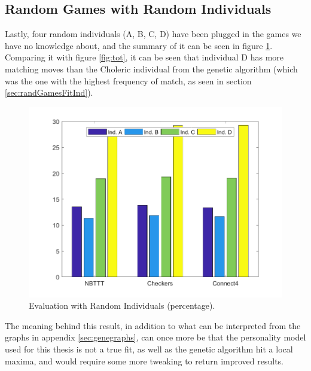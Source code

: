 \subsection{Random Games with Random Individuals}\label{sec:randomrandom}
Lastly, four random individuals (A, B, C, D) have been plugged in the games we have no knowledge about, and the summary of it can be seen in figure \ref{fig:totrandom}. Comparing it with figure \ref{fig:tot}, it can be seen that individual D has more matching moves than the Choleric individual from the genetic algorithm (which was the one with the highest frequency of match, as seen in section \ref{sec:randGamesFitInd}).
\begin{figure}[H]
\centering
	\includegraphics[scale=0.6]{figure/eval/rand/TotRand}
    \caption{Evaluation with Random Individuals (percentage).}
    \label{fig:totrandom}
\end{figure}
The meaning behind this result, in addition to what can be interpreted from the graphs in appendix \ref{sec:genegraphs}, can once more be that the personality model used for this thesis is not a true fit, as well as the genetic algorithm hit a local maxima, and would require some more tweaking to return improved results.
